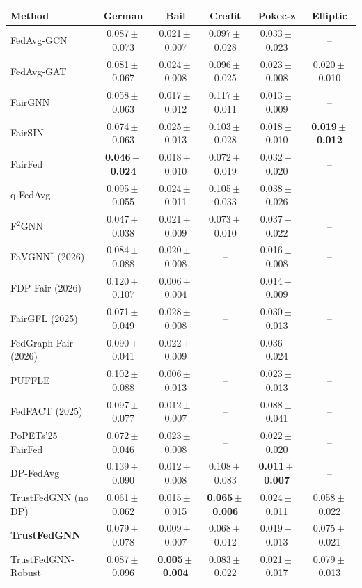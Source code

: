 \begin{tabular}{lccccc}
\toprule
Method & German & Bail & Credit & Pokec-z & Elliptic \\
\midrule
FedAvg-GCN & 0.087\,$\pm$\,0.073 & 0.021\,$\pm$\,0.007 & 0.097\,$\pm$\,0.028 & 0.033\,$\pm$\,0.023 & -- \\
FedAvg-GAT & 0.081\,$\pm$\,0.067 & 0.024\,$\pm$\,0.008 & 0.096\,$\pm$\,0.025 & 0.023\,$\pm$\,0.008 & 0.020\,$\pm$\,0.010 \\
FairGNN & 0.058\,$\pm$\,0.063 & 0.017\,$\pm$\,0.012 & 0.117\,$\pm$\,0.011 & 0.013\,$\pm$\,0.009 & -- \\
FairSIN & 0.074\,$\pm$\,0.063 & 0.025\,$\pm$\,0.013 & 0.103\,$\pm$\,0.028 & 0.018\,$\pm$\,0.010 & \textbf{0.019\,$\pm$\,0.012} \\
FairFed & \textbf{0.046\,$\pm$\,0.024} & 0.018\,$\pm$\,0.010 & 0.072\,$\pm$\,0.019 & 0.032\,$\pm$\,0.020 & -- \\
q-FedAvg & 0.095\,$\pm$\,0.055 & 0.024\,$\pm$\,0.011 & 0.105\,$\pm$\,0.033 & 0.038\,$\pm$\,0.026 & -- \\
F$^2$GNN & 0.047\,$\pm$\,0.038 & 0.021\,$\pm$\,0.009 & 0.073\,$\pm$\,0.010 & 0.037\,$\pm$\,0.022 & -- \\
FaVGNN$^{\ast}$ (2026) & 0.084\,$\pm$\,0.088 & 0.020\,$\pm$\,0.008 & -- & 0.016\,$\pm$\,0.008 & -- \\
FDP-Fair (2026) & 0.120\,$\pm$\,0.107 & 0.006\,$\pm$\,0.004 & -- & 0.014\,$\pm$\,0.009 & -- \\
FairGFL (2025) & 0.071\,$\pm$\,0.049 & 0.028\,$\pm$\,0.008 & -- & 0.030\,$\pm$\,0.013 & -- \\
FedGraph-Fair (2026) & 0.090\,$\pm$\,0.041 & 0.022\,$\pm$\,0.009 & -- & 0.036\,$\pm$\,0.024 & -- \\
PUFFLE & 0.102\,$\pm$\,0.088 & 0.006\,$\pm$\,0.013 & -- & 0.023\,$\pm$\,0.013 & -- \\
FedFACT (2025) & 0.097\,$\pm$\,0.077 & 0.012\,$\pm$\,0.007 & -- & 0.088\,$\pm$\,0.041 & -- \\
PoPETs'25 FairFed & 0.072\,$\pm$\,0.046 & 0.023\,$\pm$\,0.008 & -- & 0.022\,$\pm$\,0.020 & -- \\
\midrule
DP-FedAvg & 0.139\,$\pm$\,0.090 & 0.012\,$\pm$\,0.008 & 0.108\,$\pm$\,0.083 & \textbf{0.011\,$\pm$\,0.007} & -- \\
TrustFedGNN (no DP) & 0.061\,$\pm$\,0.062 & 0.015\,$\pm$\,0.015 & \textbf{0.065\,$\pm$\,0.006} & 0.024\,$\pm$\,0.011 & 0.058\,$\pm$\,0.022 \\
\textbf{TrustFedGNN} & 0.079\,$\pm$\,0.078 & 0.009\,$\pm$\,0.007 & 0.068\,$\pm$\,0.012 & 0.019\,$\pm$\,0.013 & 0.075\,$\pm$\,0.021 \\
TrustFedGNN-Robust & 0.087\,$\pm$\,0.096 & \textbf{0.005\,$\pm$\,0.004} & 0.083\,$\pm$\,0.022 & 0.021\,$\pm$\,0.017 & 0.079\,$\pm$\,0.013 \\
\bottomrule
\end{tabular}